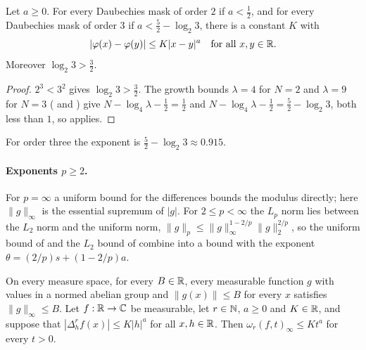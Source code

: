\begin{corollary}
\label{cor:daub-holder-orders-two-three}
\leanok
{}
Let $a \geq 0$. For every Daubechies mask of order $2$ if $a < \frac12$, and for every Daubechies
mask of order $3$ if $a < \frac52 - \log_2 3$, there is a constant $K$ with
\[
  |\varphi(x) - \varphi(y)| \leq K |x - y|^a \quad\text{for all } x, y \in \mathbb{R} .
\]
Moreover $\log_2 3 > \frac32$.
\end{corollary}

\begin{proof}
\leanok
{}
$2^3 < 3^2$ gives $\log_2 3 > \frac32$. The growth bounds $\lambda = 4$ for $N = 2$ and
$\lambda = 9$ for $N = 3$ ( and ) give
$N - \log_4 \lambda - \frac12 = \frac12$ and $N - \log_4 \lambda - \frac12 = \frac52 - \log_2 3$,
both less than $1$, so  applies.
\end{proof}

For order three the exponent is $\frac52 - \log_2 3 \approx 0.915$.

\paragraph{Exponents $p \geq 2$.}
For $p = \infty$ a uniform bound for the differences bounds the modulus directly; here
$\|g\|_\infty$ is the essential supremum of $|g|$. For $2 \leq p < \infty$ the $L_p$ norm lies
between the $L_2$ norm and the uniform norm, $\|g\|_p \leq \|g\|_\infty^{1 - 2/p} \|g\|_2^{2/p}$,
so the uniform bound of  and the $L_2$ bound of
 combine into a bound with the exponent
$\theta = (2/p) s + (1 - 2/p) a$.

\begin{lemma}
\label{lem:daub-modulus-top-pointwise}
\leanok
{}
On every measure space, for every $B \in \mathbb{R}$, every measurable function $g$ with values in a
normed abelian group and $\|g(x)\| \leq B$ for every $x$ satisfies $\|g\|_\infty \leq B$. Let
$f : \mathbb{R} \to \mathbb{C}$ be measurable, let $r \in \mathbb{N}$, $a \geq 0$ and $K \in \mathbb{R}$, and suppose that
$|\Delta_h^r f(x)| \leq K |h|^a$ for all $x, h \in \mathbb{R}$. Then $\omega_r(f, t)_\infty \leq K t^a$
for every $t > 0$.
\end{lemma}


